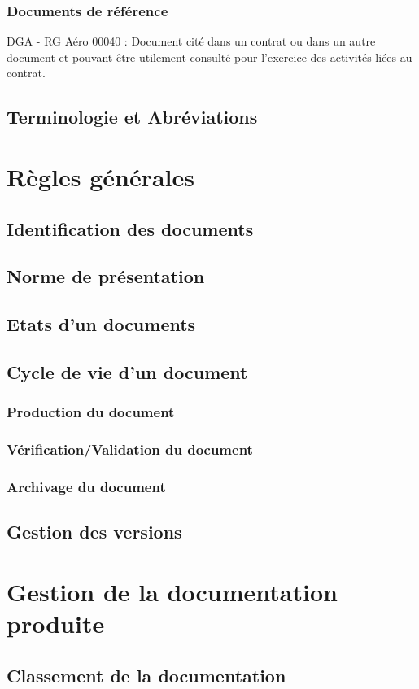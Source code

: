     \subsubsection{Documents de référence}
      DGA - RG Aéro 00040 : Document cité dans un contrat ou dans un autre document et pouvant être utilement consulté pour l'exercice des activités liées au contrat.
  \subsection{Terminologie et Abréviations}
\section{Règles générales}
  \subsection{Identification des documents}
  \subsection{Norme de présentation}
  \subsection{Etats d'un documents}
  \subsection{Cycle de vie d'un document}
    \subsubsection{Production du document}
    \subsubsection{Vérification/Validation du document}
    \subsubsection{Archivage du document}
  \subsection{Gestion des versions}
\section{Gestion de la documentation produite}
  \subsection{Classement de la documentation}
